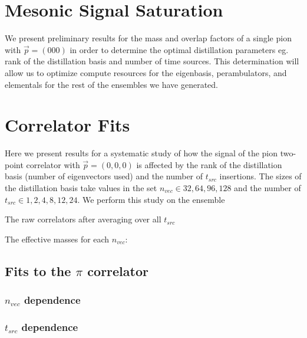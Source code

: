 \section{Mesonic Signal Saturation}

We present preliminary results for the mass and overlap factors of a single pion with $\vec{p} = (000)$ in order to determine the optimal distillation parameters eg. rank of the distillation basis and number of time sources. This determination will allow us to optimize compute resources for the eigenbasis, perambulators, and elementals for the rest of the ensembles  we have generated. 
\section{Correlator Fits}

Here we present results for a systematic study of how the signal of the pion two-point correlator with $\vec{p}=(0,0,0)$ is affected by the rank of the distillation basis (number of eigenvectors used) and the number of $t_{src}$ insertions. The sizes of the distillation basis take values in the set $n_{vec}\in {32,64,96,128}$ and the number of $t_{src} \in {1,2,4,8,12,24}$. We perform this study on the ensemble 

The raw correlators after averaging over all $t_{src}$ 

The effective masses for each $n_{vec}$: 

\subsection{Fits to the $\pi$ correlator}

\subsubsection{$n_{vec}$ dependence}

\subsubsection{$t_{src}$ dependence}

\subsection{}




